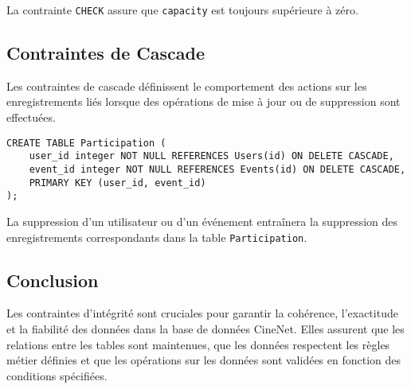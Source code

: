 La contrainte \texttt{CHECK} assure que \texttt{capacity} est toujours supérieure à zéro.

\subsection*{Contraintes de Cascade}

Les contraintes de cascade définissent le comportement des actions sur les enregistrements liés lorsque des opérations de mise à jour ou de suppression sont effectuées.

\begin{lstlisting}
CREATE TABLE Participation (
    user_id integer NOT NULL REFERENCES Users(id) ON DELETE CASCADE,
    event_id integer NOT NULL REFERENCES Events(id) ON DELETE CASCADE,
    PRIMARY KEY (user_id, event_id)
);
\end{lstlisting}

La suppression d'un utilisateur ou d'un événement entraînera la suppression des enregistrements correspondants dans la table \texttt{Participation}.

\subsection*{Conclusion}

Les contraintes d'intégrité sont cruciales pour garantir la cohérence, l'exactitude et la fiabilité des données dans la base de données CineNet. Elles assurent que les relations entre les tables sont maintenues, que les données respectent les règles métier définies et que les opérations sur les données sont validées en fonction des conditions spécifiées.
